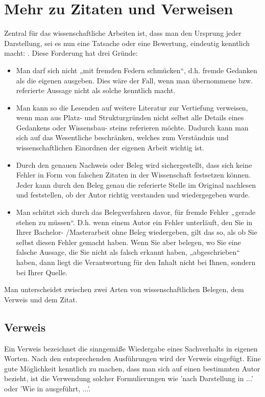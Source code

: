 \documentclass[12pt,oneside]{article}
\begin{document}
\section{Mehr zu Zitaten und Verweisen}
Zentral für das wissenschaftliche Arbeiten ist, dass man den Ursprung jeder Darstellung, sei es nun
eine Tatsache oder eine Bewertung, eindeutig kenntlich macht: \cite{shiny1}. Diese
Forderung hat drei Gründe:
\begin{itemize}
\item Man darf sich nicht „mit fremden Federn schmücken“, d.h. fremde Gedanken als die
eigenen ausgeben. Dies wäre der Fall, wenn man übernommene bzw. referierte Aussage
nicht als solche kenntlich macht.
\item  Man kann so die Lesenden auf weitere Literatur zur Vertiefung verweisen, wenn man aus
Platz- und Strukturgründen nicht selbst alle Details eines Gedankens oder Wissensbau-
steins referieren möchte. Dadurch kann man sich auf das Wesentliche beschränken,
welches zum Verständnis und wissenschaftlichen Einordnen der eigenen Arbeit wichtig ist.
\item Durch den genauen Nachweis oder Beleg wird sichergestellt, dass sich keine Fehler in
Form von falschen Zitaten in der Wissenschaft festsetzen können. Jeder kann durch den
Beleg genau die referierte Stelle im Original nachlesen und feststellen, ob der Autor richtig
verstanden und wiedergegeben wurde.
\item Man schützt sich durch das Belegverfahren davor, für fremde Fehler „gerade stehen zu
müssen“. D.h. wenn einem Autor ein Fehler unterläuft, den Sie in Ihrer Bachelor-
/Masterarbeit ohne Beleg wiedergeben, gilt das so, als ob Sie selbst diesen Fehler
gemacht haben. Wenn Sie aber belegen, wo Sie eine falsche Aussage, die Sie nicht als
falsch erkannt haben, „abgeschrieben“ haben, dann liegt die Verantwortung für den Inhalt
nicht bei Ihnen, sondern bei Ihrer Quelle.
\end{itemize}
Man unterscheidet zwischen zwei Arten von wissenschaftlichen Belegen, dem Verweis und dem
Zitat.
\subsection{Verweis}
Ein Verweis bezeichnet die sinngemäße Wiedergabe eines Sachverhalts in eigenen Worten. Nach
den entsprechenden Ausführungen wird der Verweis \cite{clemen1989combining} eingefügt. 
Eine gute Möglichkeit kenntlich zu machen, dass man sich auf einen bestimmten Autor bezieht, ist
die Verwendung solcher Formulierungen wie 'nach Darstellung in \cite{clemen1989combining} ...' oder 'Wie in \cite{clemen1989combining} ausgeführt, ...'.
\end{document}
